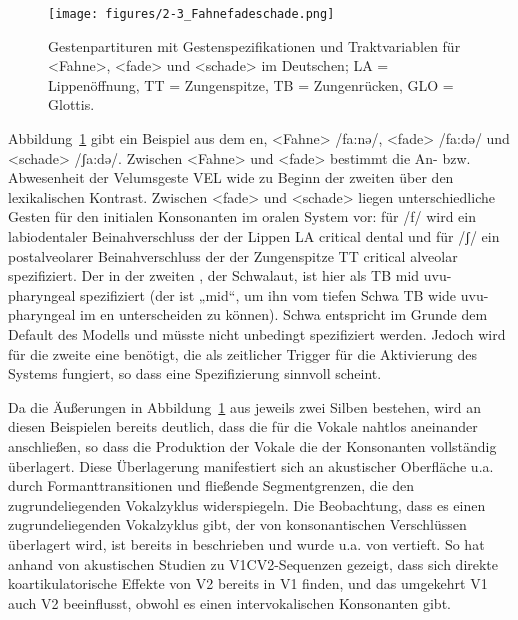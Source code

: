 \begin{figure}[b]
	\texttt{[image: figures/2-3\_Fahnefadeschade.png]}
	\caption{Gestenpartituren mit Gestenspezifikationen und Traktvariablen für <Fahne>, <fade> und <schade> im Deutschen; LA = Lippenöffnung, TT = Zungenspitze, TB = Zungenrücken, GLO = Glottis.}
	\label{figure:0203}
\end{figure}



Abbildung~\ref{figure:0203} gibt ein Beispiel aus dem en, <Fahne> /fa:nə/, <fade> /fa:də/ und <schade>  /ʃa:də/. Zwischen <Fahne> und <fade> bestimmt die An- bzw. Abwesenheit der Velumsgeste {VEL wide} zu Beginn der zweiten  über den lexikalischen Kontrast. Zwischen <fade> und <schade> liegen unterschiedliche Gesten für den initialen Konsonanten im oralen System vor: für /f/ wird ein labiodentaler Beinahverschluss der der Lippen {LA critical dental} und für /ʃ/ ein postalveolarer Beinahverschluss der der Zungenspitze {TT critical alveolar} spezifiziert. Der  in der zweiten , der Schwalaut, ist hier als {TB mid uvu-pharyngeal} spezifiziert (der  ist „mid“, um ihn vom tiefen Schwa {TB wide uvu-pharyngeal} im en unterscheiden zu können). Schwa entspricht im Grunde dem Default des Modells und müsste nicht unbedingt spezifiziert werden. Jedoch wird für die zweite  eine  benötigt, die als zeitlicher Trigger für die Aktivierung des Systems fungiert, so dass eine Spezifizierung sinnvoll scheint.

\newpage 
Da die Äußerungen in Abbildung~\ref{figure:0203} aus jeweils zwei Silben bestehen, wird an diesen Beispielen bereits deutlich, dass die  für die Vokale nahtlos aneinander anschließen, so dass die Produktion der Vokale die der Konsonanten vollständig überlagert. Diese Überlagerung manifestiert sich an akustischer Oberfläche u.a. durch Formanttransitionen und fließende Segmentgrenzen, die den zugrundeliegenden Vokalzyklus widerspiegeln. Die Beobachtung, dass es einen zugrundeliegenden Vokalzyklus gibt, der von konsonantischen Verschlüssen überlagert wird, ist bereits in \citet{Öhman1966} beschrieben und wurde u.a. von \citet{Fowler1977, Fowler1980} vertieft. So hat \citet{Öhman1966} anhand von akustischen Studien zu V1CV2-Sequenzen gezeigt, dass sich direkte koartikulatorische Effekte von V2 bereits in V1 finden, und das umgekehrt V1 auch V2 beeinflusst, obwohl es einen intervokalischen Konsonanten gibt.


